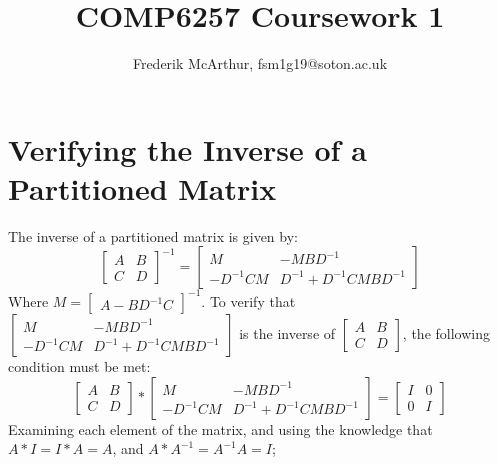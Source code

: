 \documentclass[a4paper, 11pt]{article}
\title{COMP6257 Coursework 1}
\author{Frederik McArthur, fsm1g19@soton.ac.uk}
\begin{document}
\maketitle
\tableofcontents


\section{Verifying the Inverse of a Partitioned Matrix}

The inverse of a partitioned matrix is given by:
$$
\begin{bmatrix}
    A & B \\
    C & D
\end{bmatrix}^{-1}
= \begin{bmatrix}
    M & -MBD^{-1} \\
    -D^{-1}CM & D^{-1} + D^{-1}CMBD^{-1}
\end{bmatrix}
    $$
Where $M = \begin{bmatrix}
    A - BD^{-1}C
\end{bmatrix}^{-1}$. To verify that $\begin{bmatrix}
    M & -MBD^{-1} \\
    -D^{-1}CM & D^{-1} + D^{-1}CMBD^{-1}
\end{bmatrix}$ is the inverse of $\begin{bmatrix}
    A & B \\
    C & D
\end{bmatrix}$, the following condition must be met:
$$
\begin{bmatrix}
    A & B \\
    C & D
\end{bmatrix} * 
\begin{bmatrix}
    M & -MBD^{-1} \\
    -D^{-1}CM & D^{-1} + D^{-1}CMBD^{-1}
\end{bmatrix}
= \begin{bmatrix}
    I & 0 \\
    0 & I
\end{bmatrix}$$
Examining each element of the matrix, and using the knowledge that $A*I = I*A = A$, and $A*A^{-1} = A^{-1}A = I$;
\end{document}
